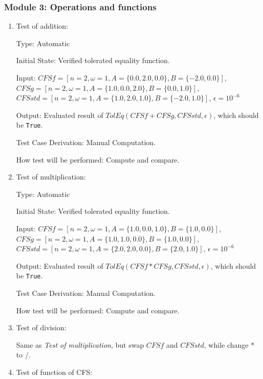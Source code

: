 \documentclass[12pt, titlepage]{article}
\newcommand{\li}[1]{\texttt{#1}}
\begin{document}
\subsubsection{Module 3: Operations and functions}

\begin{enumerate}
	\item{Test of addition: \\}
	
	Type: Automatic
	
	Initial State: Verified tolerated equality function.
	
	Input: $\mathit{CFSf}=[n=2,\omega=1, A=\{0.0, 2.0, 0.0\}, B=\{-2.0, 0.0\}]$, $\mathit{CFSg}=[n=2,\omega=1, A=\{1.0, 0.0, 2.0\}, B=\{0.0, 1.0\}]$,
	$\mathit{CFSstd}=[n=2,\omega=1, A=\{1.0, 2.0, 1.0\}, B=\{-2.0, 1.0\}]$,
	$\epsilon=10^{-6}$
	
	Output: Evaluated result of $\mathit{TolEq}(\mathit{CFSf}+\mathit{CFSg}, \mathit{CFSstd}, \epsilon)$, which should be \li{True}.
	
	Test Case Derivation: Manual Computation.
	
	How test will be performed: Compute and compare.
	
	\item{Test of multiplication:\\}
	
	Type: Automatic
	
	Initial State: Verified tolerated equality function.
	
	Input: $\mathit{CFSf}=[n=2, \omega=1, A=\{1.0, 0.0, 1.0\}, B=\{1.0, 0.0\}]$,
	$\mathit{CFSg}=[n=2, \omega=1, A=\{1.0, 1.0, 0.0\}, B=\{1.0, 0.0\}]$, 
	$\mathit{CFSstd}=[n=2, \omega=1, A=\{2.0, 2.0, 0.0\}, B=\{2.0, 1.0\}]$,
	$\epsilon=10^{-6}$
	
	Output: Evaluated result of $\mathit{TolEq}(\mathit{CFSf}*\mathit{CFSg}, \mathit{CFSstd}, \epsilon)$, which should be \li{True}.
	
	Test Case Derivation: Manual Computation.
	
	How test will be performed: Compute and compare.
	
	\item{Test of division: \\}
	
	Same as \textit{Test of multiplication}, but swap $\mathit{CFSf}$ and $\mathit{CFSstd}$, while change $*$ to $/$.
	
	\item{Test of function of CFS: \\}
	

\end{enumerate}
\end{document}
